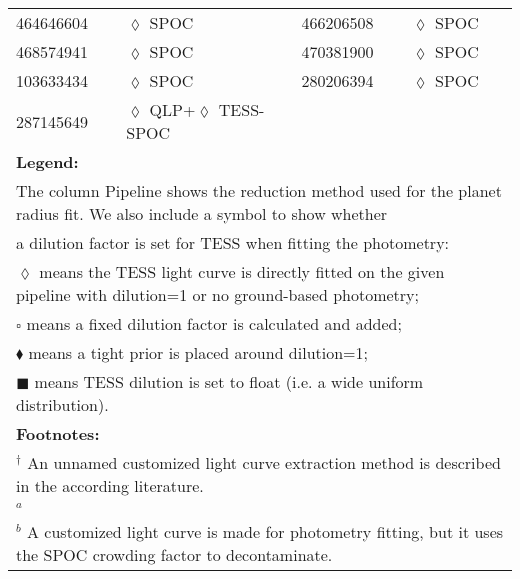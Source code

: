 \begin{longtable}{llrllr}
464646604 & $\lozenge$ SPOC & \cite{TIC_464646604} & 466206508 & $\lozenge$ SPOC & \cite{TIC_466206508} \\
468574941 & $\lozenge$ SPOC & \cite{TIC_376637093} & 470381900 & $\lozenge$ SPOC & \cite{TIC_470381900} \\
103633434 & $\lozenge$ SPOC & \cite{TIC_103633434} & 280206394 & $\lozenge$ SPOC & \cite{TIC_280206394} \\
287145649 & $\lozenge$ QLP+$\lozenge$ TESS-SPOC & \cite{TIC_332534326} \\
\hline
\multicolumn{6}{l}{\textbf{Legend:}} \\
\multicolumn{6}{l}{The column Pipeline shows the reduction method used for the planet radius fit. We also include a symbol to show whether } \\
\multicolumn{6}{l}{a dilution factor is set for TESS when fitting the photometry:} \\
\multicolumn{6}{l}{$\lozenge$ means the TESS light curve is directly fitted on the given pipeline with dilution=1 or no ground-based photometry;} \\
\multicolumn{6}{l}{$\square$ means a fixed dilution factor is calculated and added;} \\
\multicolumn{6}{l}{$\blacklozenge$ means a tight prior is placed around dilution=1;} \\
\multicolumn{6}{l}{$\blacksquare$ means TESS dilution is set to float (i.e. a wide uniform distribution).} \\
\multicolumn{6}{l}{\textbf{Footnotes:}} \\
\multicolumn{6}{l}{$^\dagger$ An unnamed customized light curve extraction method is described in the according literature. } \\
\multicolumn{6}{l}{$^a$ \cite{TASOC}} \\
\multicolumn{6}{l}{$^b$ A customized light curve is made for photometry fitting, but it uses the SPOC crowding factor to decontaminate.} \\
\end{longtable}